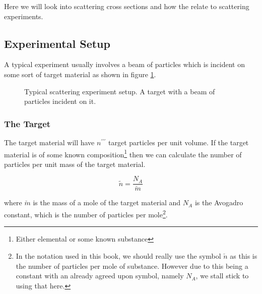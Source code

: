 Here we will look into scattering cross sections and how the relate to scattering experiments.

\subsection{Experimental Setup}
A typical experiment usually involves a beam of particles which is incident on some sort of target material as shown in figure \ref{fig:setup}.

\begin{figure}[h]
  \centering

\caption{Typical scattering experiment setup. A target with a beam of particles incident on it.} \label{fig:setup}
\end{figure}

\subsubsection{The Target}
The target material will have $n^{\prime\prime\prime}$ target particles per unit volume. If the target material is of some known composition\footnote{Either elemental or some known substance} then we can calculate the number of particles per unit mass of the target material.

\begin{equation}
  \label{eq:spesific number}
\tilde{n} = \frac{N_A}{\check{m}}
\end{equation}

where $\check{m}$ is the mass of a mole of the target material and $N_A$ is the Avogadro constant, which is the number of particles per mole\footnote{In the notation used in this book, we should really use the symbol $\check{n}$ as this is the number of particles per mole of substance. However due to this being a constant with an already agreed upon symbol, namely $N_A$, we stall stick to using that here.}.
